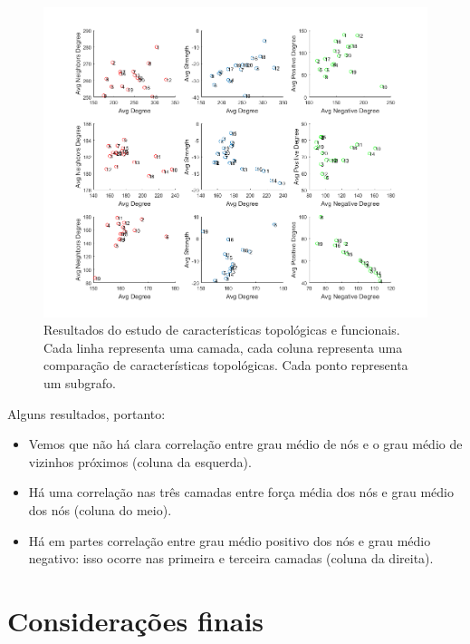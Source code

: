 \documentclass{article}
\begin{document}
            \begin{figure}[h!]
                \centering
                \includegraphics[scale=0.35]{Images/Structure vs function.png}
                \caption{Resultados do estudo de características topológicas e funcionais.
                Cada linha representa uma camada, cada coluna representa uma comparação de características topológicas.
                Cada ponto representa um subgrafo.}
                \label{fig6}
            \end{figure}

            Alguns resultados, portanto:

            \begin{itemize}
                \item Vemos que não há clara correlação entre grau médio de nós e o grau médio de vizinhos próximos (coluna da esquerda).
                \item Há uma correlação nas três camadas entre força média dos nós e grau médio dos nós (coluna do meio).
                \item Há em partes correlação entre grau médio positivo dos nós e grau médio negativo: isso ocorre nas primeira e terceira camadas (coluna da direita).
            \end{itemize}

    \section{Considerações finais}
\end{document}
